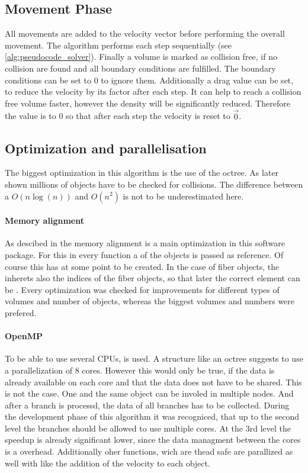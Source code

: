 \subsection{Movement Phase}
All movements are added to the velocity vector before performing the overall movement.
The algorithm performs each step sequentially (see \cref{alg:pseudocode_solver}).
% 
Finally a volume is marked as collision free, if no collision are found and all boundary conditions are fulfilled. 
The boundary conditions can be set to 0 to ignore them.
Additionally a drag value can be set, to reduce the velocity by its factor after each step.
It can help to reach a collision free volume faster, however the density will be significantly reduced.
Therefore the value is to 0 so that after each step the velocity is reset to $\vec{0}$. 
% 
\subsection{Optimization and parallelisation}\label{sec:modelOpt}
% 
% 
The biggest optimization in this algorithm is the use of the octree.
As later shown millions \dummy[ueberpruefen]{} of objects have to be checked for collisions.
The difference between a $O(n\log(n))$ and $O(n^2)$ is not to be underestimated here.
%
\paragraph{Memory alignment}
As descibed in  the memory alignment is a main optimization in this software package.
For this in every function a  of the objects is passed as reference.
Of course this  has at some point to be created.
In the case of fiber objects, the  inherets also the indices of the fiber objects, so that later the correct element can be \dummy{}.
% 
Every optimization was checked for improvements for different types of volumes and number of objects, whereas the biggest volumes and numbers were prefered.
% 
% 
\paragraph{OpenMP}
% 
To be able to use several \acp{CPU}, \openmp{} is used.
A structure like an octree suggests to use a parallelization of 8 cores.
However this would only be true, if the data is already available on each core and that the data does not have to be shared.
This is not the case.
One and the same object can be involed in multiple nodes.
And after a branch is processd, the data of all branches has to be collected.
During the development phase of this algorithm it was recogniced, that up to the second level the branches should be allowed to use multiple cores. At the 3rd level the speedup is already significant lower, since the data managment between the cores is a overhead.
Additionally oher functions, wich are thead safe are parallized as well with \openmp{} like \eg{} the addition of the velocity to each object.
% 
% 
% 
